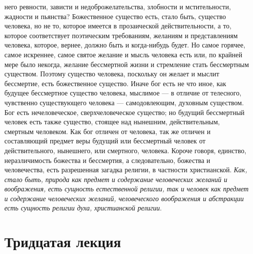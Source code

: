 \documentclass[12pt]{article}
\begin{document}
него ревности, зависти и недоброжелательства, злобности и мстительности, жадности и пьянства? Божественное существо есть, стало быть, существо человека, но не то, которое имеется в прозаической действительности, а то, которое соответствует поэтическим требованиям, желаниям и представлениям человека, которое, вернее, должно быть и когда-нибудь будет. Но самое горячее, самое искреннее, самое святое желание и мысль человека есть или, по крайней мере было некогда, желание бессмертной жизни и стремление стать бессмертным существом. Поэтому существо человека, поскольку он желает и мыслит бессмертие, есть божественное существо. Иначе бог есть не что иное, как будущее бессмертное существо человека, мыслимое --- в отличие от телесного, чувственно существующего человека --- самодовлеющим, духовным существом. Бог есть нечеловеческое, сверхчеловеческое существо; но будущий бессмертный человек есть также существо, стоящее над нынешним, действительным, смертным человеком. Как бог отличен от человека, так же отличен и составляющий предмет веры будущий или бессмертный человек от действительного, нынешнего, или смертного, человека. Короче говоря, единство, неразличимость божества и бессмертия, а следовательно, божества и человечества, есть разрешенная загадка религии, в частности христианской. \emph{Как, стало быть, природа как предмет и содержание человеческих желаний и воображения, есть сущность естественной религии, так и человек как предмет и содержание человеческих желаний, человеческого воображения и абстракции есть сущность религии духа, христианской религии}. 

{}
\section*{Тридцатая лекция}
\end{document}
